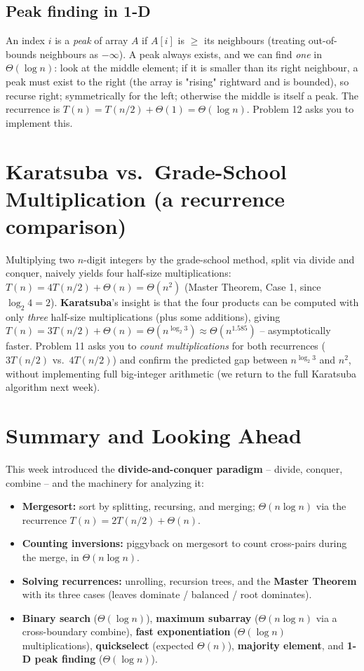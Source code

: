 \documentclass[11pt]{article}
\begin{document}
\subsection{Peak finding in 1-D}

An index $i$ is a \emph{peak} of array $A$ if $A[i]$ is $\ge$ its neighbours (treating
out-of-bounds neighbours as $-\infty$). A peak always exists, and we can find \emph{one} in
$\Theta(\log n)$: look at the middle element; if it is smaller than its right neighbour, a
peak must exist to the right (the array is "rising" rightward and is bounded), so recurse
right; symmetrically for the left; otherwise the middle is itself a peak. The recurrence is
$T(n) = T(n/2) + \Theta(1) = \Theta(\log n)$. Problem 12 asks you to implement this.

\section{Karatsuba vs.\ Grade-School Multiplication (a recurrence comparison)}

Multiplying two $n$-digit integers by the grade-school method, split via divide and
conquer, naively yields four half-size multiplications: $T(n) = 4T(n/2) + \Theta(n) =
\Theta(n^2)$ (Master Theorem, Case 1, since $\log_2 4 = 2$). \textbf{Karatsuba}'s insight is
that the four products can be computed with only \emph{three} half-size multiplications
(plus some additions), giving $T(n) = 3T(n/2) + \Theta(n) = \Theta(n^{\log_2 3}) \approx
\Theta(n^{1.585})$ -- asymptotically faster. Problem 11 asks you to \emph{count
multiplications} for both recurrences ($3T(n/2)$ vs.\ $4T(n/2)$) and confirm the predicted
gap between $n^{\log_2 3}$ and $n^2$, without implementing full big-integer arithmetic (we
return to the full Karatsuba algorithm next week).

\section{Summary and Looking Ahead}

This week introduced the \textbf{divide-and-conquer paradigm} -- divide, conquer, combine --
and the machinery for analyzing it:

\begin{itemize}
    \item \textbf{Mergesort:} sort by splitting, recursing, and merging; $\Theta(n \log n)$
    via the recurrence $T(n) = 2T(n/2) + \Theta(n)$.
    \item \textbf{Counting inversions:} piggyback on mergesort to count cross-pairs during
    the merge, in $\Theta(n \log n)$.
    \item \textbf{Solving recurrences:} unrolling, recursion trees, and the \textbf{Master
    Theorem} with its three cases (leaves dominate / balanced / root dominates).
    \item \textbf{Binary search} ($\Theta(\log n)$), \textbf{maximum subarray} ($\Theta(n
    \log n)$ via a cross-boundary combine), \textbf{fast exponentiation} ($\Theta(\log n)$
    multiplications), \textbf{quickselect} (expected $\Theta(n)$), \textbf{majority element},
    and \textbf{1-D peak finding} ($\Theta(\log n)$).
\end{itemize}
\end{document}
